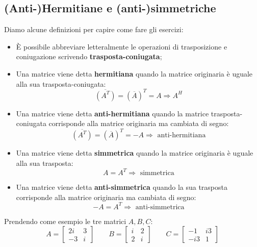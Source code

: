 \documentclass[a4paper]{article}
\begin{document}
	\subsection{(Anti-)Hermitiane e (anti-)simmetriche}
	
	Diamo alcune definizioni per capire come fare gli esercizi:
	\begin{itemize}
		\item È possibile abbreviare letteralmente le operazioni di trasposizione e coniugazione scrivendo \textbf{trasposta-coniugata};
		
		\item Una matrice viene detta \textcolor{Red3}{\textbf{hermitiana}} quando la matrice originaria è uguale alla sua trasposta-coniugata:
		\begin{equation*}
			\overline{\left(A^{T}\right)} = \left(\overline{A}\right)^{T} = A \Longrightarrow A^{H}
		\end{equation*}
		
		\item Una matrice viene detta \textcolor{Red3}{\textbf{anti-hermitiana}} quando la matrice trasposta-coniugata corrisponde alla matrice originaria ma cambiata di segno:
		\begin{equation*}
			\overline{\left(A^{T}\right)} = \left(\overline{A}\right)^{T} = -A \Longrightarrow \text{ anti-hermitiana}
		\end{equation*}
		
		\item Una matrice viene detta \textcolor{Red3}{\textbf{simmetrica}} quando la matrice originaria è uguale alla sua trasposta:
		\begin{equation*}
			A = A^{T} \Longrightarrow \text{ simmetrica}
		\end{equation*}
		
		\item Una matrice viene detta \textcolor{Red3}{\textbf{anti-simmetrica}} quando la sua trasposta corrisponde alla matrice originaria ma cambiata di segno:
		\begin{equation*}
			-A = A^{T} \Longrightarrow \text{ anti-simmetrica}
		\end{equation*}
	\end{itemize}
	Prendendo come esempio le tre matrici $A,B,C$:
	\begin{equation*}
		A = \begin{bmatrix}
			2i 	& 3		\\
			-3	& i
		\end{bmatrix} \hspace{2em}
		B = \begin{bmatrix}
			i 	& 2		\\
			2	& i
		\end{bmatrix} \hspace{2em}
		C = \begin{bmatrix}
			-1 	& i3	\\
			-i3	& 1
		\end{bmatrix}
	\end{equation*}
\end{document}
